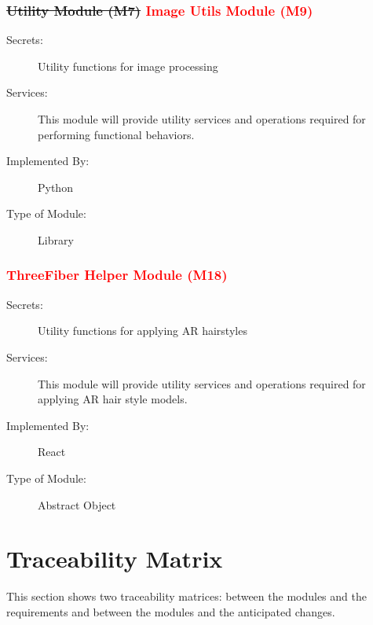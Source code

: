 \documentclass[12pt, titlepage]{article}
\begin{document}
\subsubsection{\sout{Utility Module (M7)} \textcolor{red}{Image Utils Module (M9)}}

\begin{description}
\item[Secrets:]Utility functions for image processing
\item[Services:] This module will provide utility services and operations required for performing functional behaviors.
\item[Implemented By:] Python
\item[Type of Module:] Library
\end{description}

\color{red}
\subsubsection{\textcolor{red}{ThreeFiber Helper Module (M18)}}

\begin{description}
\item[Secrets:]Utility functions for applying AR hairstyles
\item[Services:] This module will provide utility services and operations required for applying AR hair style models.
\item[Implemented By:] React
\item[Type of Module:] Abstract Object
\end{description}

\color{black}
\section{Traceability Matrix} \label{SecTM}

This section shows two traceability matrices: between the modules and the
requirements and between the modules and the anticipated changes.
\end{document}

